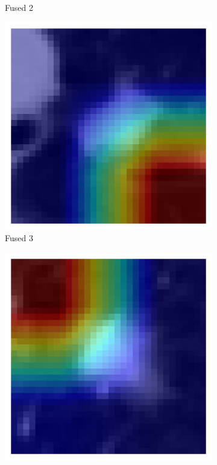 \begin{figure}[htbp]
\begin{subfigure}[b]{0.18\textwidth}
        \caption*{Fused 2}
    \end{subfigure}
    \begin{subfigure}[b]{0.18\textwidth}
        \centering
        \includegraphics[width=\linewidth]{figures/heatmaps/ex3/sample_gradcam.png}
        \caption*{Fused 3}
    \end{subfigure}
    \begin{subfigure}[b]{0.18\textwidth}
        \centering
        \includegraphics[width=\linewidth]{figures/heatmaps/ex4/sample_gradcam.png}

\end{subfigure}
\end{figure}

